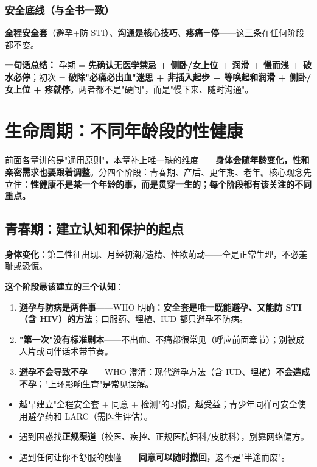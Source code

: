 \documentclass[12pt,UTF8,openany]{ctexbook}
\begin{document}
\subsection{安全底线（与全书一致）}

\textbf{全程安全套}（避孕+防 STI）、\textbf{沟通是核心技巧}、\textbf{疼痛=停}——这三条在任何阶段都不变。

\vspace{1em}
\noindent\textbf{一句话总结：} 孕期 = \textbf{先确认无医学禁忌 + 侧卧/女上位 + 润滑 + 慢而浅 + 破水必停}；初次 = \textbf{破除"必痛必出血"迷思 + 非插入起步 + 等唤起和润滑 + 侧卧/女上位 + 疼就停}。两者都不是"硬闯"，而是"慢下来、随时沟通"。

\chapter{生命周期：不同年龄段的性健康}

前面各章讲的是"通用原则"，本章补上唯一缺的维度——\textbf{身体会随年龄变化，性和亲密需求也要跟着调整}。分四个阶段：青春期、产后、更年期、老年。核心观念先立住：\textbf{性健康不是某一个年龄的事，而是贯穿一生的；每个阶段都有该关注的不同重点。}

\section{青春期：建立认知和保护的起点}

\textbf{身体变化}：第二性征出现、月经初潮/遗精、性欲萌动——全是正常生理，不必羞耻或恐慌。

\textbf{这个阶段最该建立的三个认知}：

\begin{enumerate}[leftmargin=2em,itemsep=0.3em]
  \item \textbf{避孕与防病是两件事}——WHO 明确：\textbf{安全套是唯一既能避孕、又能防 STI（含 HIV）的方法}；口服药、埋植、IUD 都只避孕不防病。
  \item \textbf{"第一次"没有标准剧本}——不出血、不痛都很常见（呼应前面章节）；别被成人片或同伴话术带节奏。
  \item \textbf{避孕不会导致不孕}——WHO 澄清：现代避孕方法（含 IUD、埋植）\textbf{不会造成不孕}；"上环影响生育"是常见误解。
\end{enumerate}

\begin{itemize}[leftmargin=2em,itemsep=0.3em]
  \item 越早建立"全程安全套 + 同意 + 检测"的习惯，越受益；青少年同样可安全使用避孕药和 LARC（需医生评估）。
  \item 遇到困惑找\textbf{正规渠道}（校医、疾控、正规医院妇科/皮肤科），别靠网络偏方。
  \item 遇到任何让你不舒服的触碰——\textbf{同意可以随时撤回}，这不是"半途而废"。
\end{itemize}
\end{document}
